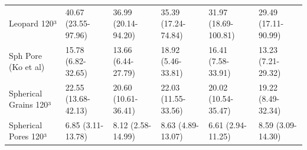 \begin{tabular}{llllll}
Leopard 120³ & 40.67 (23.55-97.96) & 36.99 (20.14-94.20) & 35.39 (17.24-74.84) & 31.97 (18.69-100.81) & 29.49 (17.11-90.99) \\
Sph Pore (Ko et al) & 15.78 (6.82-32.65) & 13.66 (6.44-27.79) & 18.92 (5.46-33.81) & 16.41 (7.58-33.91) & 13.23 (7.21-29.32) \\
Spherical Grains 120³ & 22.55 (13.68-42.13) & 20.60 (10.61-36.41) & 22.03 (11.55-33.56) & 20.02 (10.54-35.47) & 19.22 (8.49-32.34) \\
Spherical Pores 120³ & 6.85 (3.11-13.78) & 8.12 (2.58-14.99) & 8.63 (4.89-13.07) & 6.61 (2.94-11.25) & 8.59 (3.09-14.30) \\
\bottomrule
\end{tabular}

